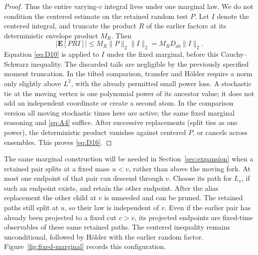 \begin{proof}
Thus the entire varying-$v$ integral lives under one marginal law.
We do not condition the centered estimate on the retained random test
$P$.  Let $I$ denote the centered integral, and truncate the product $R$
of the earlier factors at its deterministic envelope product $M_R$.
Then
\[
 |\mathbf E[PRI]|\le M_R\|P\|_2\|I\|_2
       =M_R D_{ab}\|I\|_2.
\]
Equation \eqref{eq:D10} is applied to $I$ under the fixed marginal,
before this Cauchy--Schwarz inequality.  The discarded tails are
negligible by the previously specified moment truncation.  In the
tilted comparison, transfer and H\"older require a norm only slightly
above $L^2$, with the already permitted small power loss.  A stochastic tie at the moving vertex
is one polynomial power of its ancestor value; it does not add an
independent coordinate or create a second atom. In the comparison version all moving stochastic times here are active; the same fixed marginal reasoning and \eqref{eq:A4} suffice. After successive replacements (split ties as one power), the deterministic product vanishes against centered \(P\), or cancels across ensembles. This proves \eqref{eq:D16}.
\end{proof}

\begin{remark}\label{rem:statistics-earlier-pair}
The same marginal construction will be needed in Section~\ref{sec:expansion}
when a retained pair splits at a fixed mass $u<v$, rather than above the
moving fork.  At most one endpoint of that pair can descend through $v$.
Choose its path for $L_v$, if such an endpoint exists, and retain the
other endpoint.  After the alias replacement the other child at $v$ is
unneeded and can be pruned.  The retained paths still split at $u$, so
their law is independent of $v$.  Even if the earlier pair has already
been projected to a fixed cut $c>v$, its projected endpoints are
fixed-time observables of these same retained paths.  The centered
inequality remains unconditional, followed by H\"older with the earlier
random factor.  Figure~\ref{fig:fixed-marginal} records this configuration.
\end{remark}



